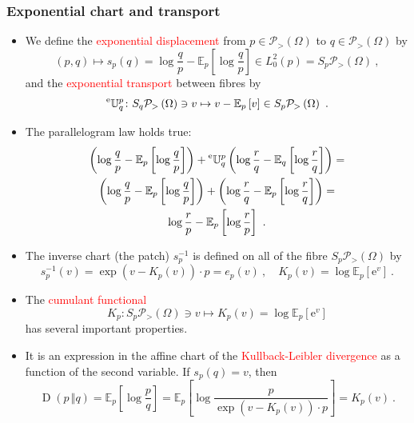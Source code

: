 \documentclass[xcolor=svgnames]{beamer}
\newcommand{\KL}[2]{\operatorname{D}\left(#1\,\Vert#2\right)}
\newcommand{\etransport}[2]{\prescript{\text{e}}{} {\mathbb U} _ {#1} ^ {#2}}
\newcommand{\euler}{\mathrm{e}}
\newcommand{\expectat}[2]{\mathbb E_{#1}\left[#2\right]}
\newcommand{\expfibreat}[2]{S_{#1}#2}
\newcommand{\expof}[1]{\exp\left(#1\right)}
\newcommand{\opensimplexon}[1]{\mathcal P_>\left(#1\right)}
\newcommand{\rosso}[1]{\textcolor{red}{#1}}
\renewcommand{\emph}{\rosso}
\begin{document}
\begin{frame}\small\frametitle{Exponential chart and transport}

  \begin{itemize}

   \item We define the \emph{exponential displacement} from $p \in \opensimplexon \Omega$ to $q \in \opensimplexon \Omega$ by
    \begin{equation*}
(p,q) \mapsto s_p(q) = \log \frac q  p - \expectat p {\log \frac q p} \in L^2_0(p) = \expfibreat p {\opensimplexon \Omega} \ ,
    \end{equation*}
    and the \emph{exponential transport} between fibres  by
    \begin{equation*}
      \etransport q p \colon \expfibreat q {\opensimplexon \Omega} \ni v \mapsto v - \expectat p v \in \expfibreat p {\opensimplexon \Omega} \ .
    \end{equation*}
\item The parallelogram law holds true:
    \begin{multline*}
      \left(\log \frac q p - \expectat p {\log \frac q p}\right) + \etransport q p \left(\log \frac r q - \expectat q {\log \frac r q}\right) = \\   \left(\log \frac q p - \expectat p {\log \frac q p}\right) + \left(\log \frac r q - \expectat p {\log \frac r q}\right) = \\ \log \frac r p - \expectat p {\log \frac r p} \ . 
    \end{multline*}
\item The inverse chart (the patch) $s_p^{-1}$ is defined on all of the fibre $\expfibreat p {\opensimplexon \Omega}$ by
  \begin{equation*}
    s^{-1}_p(v) = \expof{v - K_p(v)} \cdot p = e_p(v) \ , \quad K_p(v) = \log \expectat p {\euler^v} \ .
  \end{equation*}
\item The \emph{cumulant functional}
\begin{equation*}
   K_p \colon \expfibreat p {\opensimplexon \Omega} \ni v \mapsto K_p(v) = \log \expectat p {\euler^v}
 \end{equation*}
 has several important properties.
 \item It is an expression in the affine chart of the \emph{Kullback-Leibler divergence} as a function of the second variable. If $s_p(q) = v$, then
\begin{equation*}
    \KL p q = \expectat p {\log \frac p q} = \expectat p {\log \frac p {\expof{v - K_p(v)} \cdot p}} = K_p(v) \ .
\end{equation*}
\end{itemize}
\end{frame}
\end{document}
